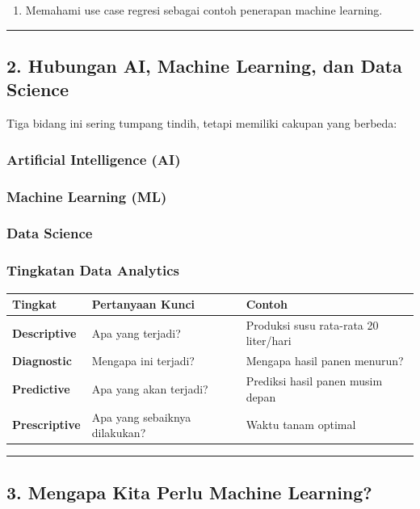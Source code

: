 \documentclass[12pt,a4paper]{article}
\begin{document}
\begin{enumerate}
\item Memahami use case regresi sebagai contoh penerapan machine learning.
\end{enumerate}


\hrule


\subsection{2. Hubungan AI, Machine Learning, dan Data Science}

Tiga bidang ini sering tumpang tindih, tetapi memiliki cakupan yang berbeda:


\subsubsection{Artificial Intelligence (AI)}

\subsubsection{Machine Learning (ML)}

\subsubsection{Data Science}

\subsubsection{Tingkatan Data Analytics}

\begin{tabular}{|l|l|l|}
\hline
Tingkat & Pertanyaan Kunci & Contoh \\
\hline
\textbf{Descriptive} & Apa yang terjadi? & Produksi susu rata-rata 20 liter/hari \\
\hline
\textbf{Diagnostic} & Mengapa ini terjadi? & Mengapa hasil panen menurun? \\
\hline
\textbf{Predictive} & Apa yang akan terjadi? & Prediksi hasil panen musim depan \\
\hline
\textbf{Prescriptive} & Apa yang sebaiknya dilakukan? & Waktu tanam optimal \\
\hline
\end{tabular}


\hrule


\subsection{3. Mengapa Kita Perlu Machine Learning?}
\end{document}
